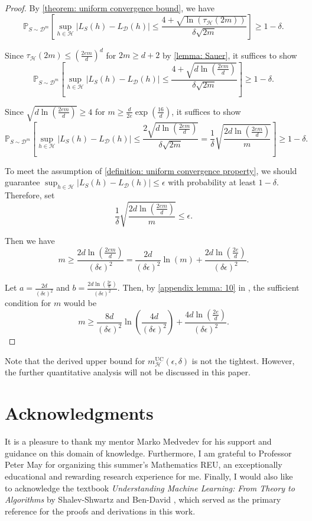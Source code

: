 \documentclass[openany, amssymb, psamsfonts]{amsart}
\theoremstyle{definition}
\numberwithin{equation}{section}
\begin{document}
\begin{proof}
By \autoref{theorem: uniform convergence bound}, we have
\[
\mathbb{P}_{S \sim \mathcal{D}^m}\left[ \sup_{h \in \mathcal{H}} |L_S(h) - L_{\mathcal{D}}(h)| \leq \frac{4 + \sqrt{\ln(\tau_{\mathcal{H}}(2m))}}{\delta \sqrt{2m}} \right] \geq 1 - \delta.
\]

Since $\tau_{\mathcal{H}}(2m) \leq \left(\frac{2em}{d}\right)^d$ for $2m \geq d+2$ by \autoref{lemma: Sauer}, it suffices to show
\[
\mathbb{P}_{S \sim \mathcal{D}^m}\left[ \sup_{h \in \mathcal{H}} |L_S(h) - L_{\mathcal{D}}(h)| \leq \frac{4 + \sqrt{d \ln\left(\frac{2em}{d}\right)}}{\delta \sqrt{2m}}\right] \geq 1 - \delta.
\]

Since $\sqrt{d \ln\left(\frac{2em}{d}\right)} \geq 4$ for $m \geq \frac{d}{2e} \exp \left(\frac{16}{d}\right)$, it suffices to show
\[
\mathbb{P}_{S \sim \mathcal{D}^m}\left[ \sup_{h \in \mathcal{H}} |L_S(h) - L_{\mathcal{D}}(h)| \leq \frac{2 \sqrt{d \ln\left(\frac{2em}{d}\right)}}{\delta \sqrt{2m}} = \frac{1}{\delta} \sqrt{\frac{2d \ln\left(\frac{2em}{d}\right)}{m}}\right] \geq 1 - \delta.
\]

To meet the assumption of \autoref{definition: uniform convergence property}, we should guarantee $\sup_{h \in \mathcal{H}} |L_S(h) - L_{\mathcal{D}}(h)| \leq \epsilon$ with probability at least $1 - \delta$. Therefore, set
\[
\frac{1}{\delta} \sqrt{\frac{2d \ln\left(\frac{2em}{d}\right)}{m}} \leq \epsilon.
\]

Then we have
\[
m \geq \frac{2d \ln\left(\frac{2em}{d}\right)}{(\delta \epsilon)^2} = \frac{2d}{(\delta \epsilon)^2} \ln(m) + \frac{2d \ln\left(\frac{2e}{d}\right)}{(\delta \epsilon)^2}.
\]

Let $a = \frac{2d}{(\delta \epsilon)^2}$ and $b = \frac{2d \ln\left(\frac{2e}{d}\right)}{(\delta \epsilon)^2}$. Then, by \autoref{appendix lemma: 10} in , the sufficient condition for $m$ would be
\[
m \geq \frac{8d}{(\delta \epsilon)^2} \ln\left( \frac{4d}{(\delta \epsilon)^2} \right) + \frac{4d \ln\left(\frac{2e}{d}\right)}{(\delta \epsilon)^2}.
\]
\end{proof}

Note that the derived upper bound for $m_{\mathcal{H}}^{\text{UC}}(\epsilon, \delta)$ is not the tightest. However, the further quantitative analysis will not be discussed in this paper.

\section*{Acknowledgments}  
It is a pleasure to thank my mentor Marko Medvedev for his support and guidance on this domain of knowledge. Furthermore, I am grateful to Professor Peter May for organizing this summer's Mathematics REU, an exceptionally educational and rewarding research experience for me. Finally, I would also like to acknowledge the textbook \textit{Understanding Machine Learning: From Theory to Algorithms} by Shalev-Shwartz and Ben-David \cite{Shai2014}, which served as the primary reference for the proofs and derivations in this work.
\end{document}
